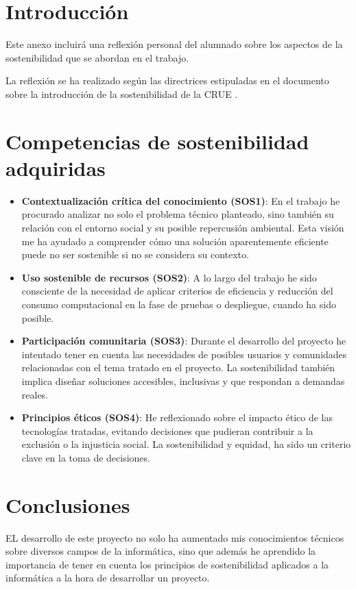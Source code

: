 
\section{Introducción}
Este anexo incluirá una reflexión personal del alumnado sobre los aspectos de la sostenibilidad que se abordan en el trabajo.

La reflexión se ha realizado según las directrices estipuladas en el documento  sobre la introducción de la sostenibilidad de la CRUE \cite{Sos}.


\section{Competencias de sostenibilidad
adquiridas}

\begin{itemize}
    \item \textbf{Contextualización crítica del conocimiento (SOS1)}: En el trabajo he procurado analizar no solo el problema técnico planteado, sino también su relación con el entorno social y su posible repercusión ambiental. Esta visión me ha ayudado a comprender cómo una solución aparentemente eficiente puede no ser sostenible si no se considera su contexto.
    \item \textbf{Uso sostenible de recursos (SOS2)}: A lo largo del trabajo he sido consciente de la necesidad de aplicar criterios de eficiencia y reducción del consumo computacional en la fase de pruebas o despliegue, cuando ha sido posible.
    \item \textbf{Participación comunitaria (SOS3)}: Durante el desarrollo del proyecto he intentado tener en cuenta las necesidades de posibles usuarios y comunidades relacionadas con el tema tratado en el proyecto. La sostenibilidad también implica diseñar soluciones accesibles, inclusivas y que respondan a demandas reales.
    \item \textbf{Principios éticos (SOS4)}: He reflexionado sobre el impacto ético de las tecnologías tratadas, evitando decisiones que pudieran contribuir a la exclusión o la injusticia social. La sostenibilidad y equidad, ha sido un criterio clave en la toma de decisiones.
\end{itemize}



\section{Conclusiones}
EL desarrollo de este proyecto no solo ha aumentado mis conocimientos técnicos sobre diversos campos de la informática, sino que además he aprendido la importancia de tener en cuenta los principios de sostenibilidad aplicados a la informática a la hora de desarrollar un proyecto.  

